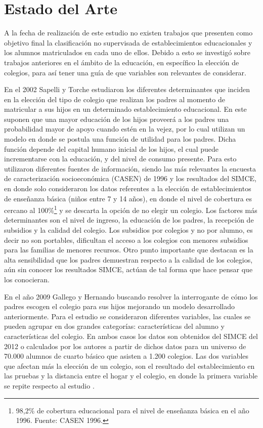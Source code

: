 \chapter{Estado del Arte}

A la fecha de realización de este estudio no existen trabajos que presenten como objetivo final la clasificación no supervisada de establecimientos educacionales y los alumnos matriculados en cada uno de ellos. Debido a esto se investigó sobre trabajos anteriores en el ámbito de la educación, en específico la elección de colegios, para así tener una guía de que variables son relevantes de considerar.

En el 2002 Sapelli y Torche \cite{SAPELLI2002} estudiaron los diferentes determinantes que inciden en la elección del tipo de colegio que realizan los padres al momento de matricular a sus hijos en un determinado establecimiento educacional. En este suponen que una mayor educación de los hijos proveerá a los padres  una probabilidad mayor de apoyo cuando estén en la vejez, por lo cual utilizan un modelo en donde se postula una función de utilidad para los padres. Dicha función depende del capital humano inicial de los hijos, el cual puede incrementarse con la educación, y del nivel de consumo presente. Para esto utilizaron diferentes fuentes de información, siendo las más relevantes la encuesta de caracterización socioeconómica (CASEN) de 1996 \cite{CASEN1996} y los resultados del SIMCE, en donde solo consideraron los datos referentes a la elección de establecimientos de enseñanza básica (niños entre 7 y 14 años), en donde el nivel de cobertura es cercano al 100\%\footnote{98,2\% de cobertura educacional para el nivel de enseñanza básica en el año 1996. Fuente: CASEN 1996.} y se descarta la opción de no elegir un colegio. Los factores más determinantes son el nivel de ingreso, la educación de los padres, la recepción de subsidios y la calidad del colegio. Los subsidios por colegios y no por alumno, es decir no son portables, dificultan el acceso a los colegios con menores subsidios para las familias de menores recursos. Otro punto importante que destacan es la alta sensibilidad que los padres demuestran respecto a la calidad de los colegios, aún sin conocer los resultados SIMCE, actúan de tal forma que hace pensar que los conocieran.

En el año 2009 Gallego y Hernando \cite{gallego2010school} buscando resolver la interrogante de cómo los padres escogen el colegio para sus hijos mejorando un modelo desarrollado anteriormente. Para el estudio se consideraron diferentes variables, las cuales se pueden agrupar en dos grandes categorías: características del alumno y características del colegio. En ambos casos los datos son obtenidos del SIMCE del 2012 o calculados por los autores a partir de dichos datos para un universo de 70.000 alumnos de cuarto básico que asisten a 1.200 colegios. Las dos variables que afectan más la elección de un colegio, son el resultado del establecimiento en las pruebas y la distancia entre el hogar y el colegio, en donde la primera variable se repite respecto al estudio \cite{SAPELLI2002}.

